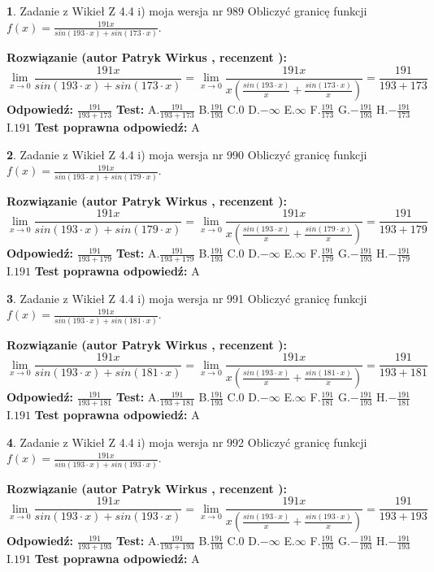 \documentclass[12pt, a4paper]{article}
\theoremstyle{definition} %
\newtheorem{zad}{}
\newcommand{\zadStart}[1]{\begin{zad}#1\newline}
\newcommand{\zadStop}{\end{zad}}
\newcommand{\rozwStart}[2]{\noindent \textbf{Rozwiązanie (autor #1 , recenzent #2): }\newline}
\newcommand{\rozwStop}{\newline}
\newcommand{\odpStart}{\noindent \textbf{Odpowiedź:}\newline}
\newcommand{\odpStop}{\newline}
\newcommand{\testStart}{\noindent \textbf{Test:}\newline}
\newcommand{\testStop}{\newline}
\newcommand{\kluczStart}{\noindent \textbf{Test poprawna odpowiedź:}\newline}
\newcommand{\kluczStop}{\newline}
\begin{document}
\zadStart{Zadanie z Wikieł Z 4.4 i) moja wersja nr 989}
Obliczyć granicę funkcji $f(x)=\frac{191x}{sin(193\cdot x) +sin(173\cdot x)}$.
\zadStop
\rozwStart{Patryk Wirkus}{}
$$\lim\limits_{x\to 0}\frac{191x}{sin(193\cdot x) +sin(173\cdot x)}=\lim\limits_{x\to 0}\frac{191x}{x(\frac{sin(193\cdot x)}{x}+\frac{sin(173\cdot x)}{x})}=\frac{191}{193+173}$$
\rozwStop
\odpStart
$\frac{191}{193+173}$
\odpStop
\testStart
A.$\frac{191}{193+173}$
B.$\frac{191}{193}$
C.$0$
D.$-\infty$
E.$\infty$
F.$\frac{191}{173}$
G.$-\frac{191}{193}$
H.$-\frac{191}{173}$
I.$191$
\testStop
\kluczStart
A
\kluczStop



\zadStart{Zadanie z Wikieł Z 4.4 i) moja wersja nr 990}
Obliczyć granicę funkcji $f(x)=\frac{191x}{sin(193\cdot x) +sin(179\cdot x)}$.
\zadStop
\rozwStart{Patryk Wirkus}{}
$$\lim\limits_{x\to 0}\frac{191x}{sin(193\cdot x) +sin(179\cdot x)}=\lim\limits_{x\to 0}\frac{191x}{x(\frac{sin(193\cdot x)}{x}+\frac{sin(179\cdot x)}{x})}=\frac{191}{193+179}$$
\rozwStop
\odpStart
$\frac{191}{193+179}$
\odpStop
\testStart
A.$\frac{191}{193+179}$
B.$\frac{191}{193}$
C.$0$
D.$-\infty$
E.$\infty$
F.$\frac{191}{179}$
G.$-\frac{191}{193}$
H.$-\frac{191}{179}$
I.$191$
\testStop
\kluczStart
A
\kluczStop



\zadStart{Zadanie z Wikieł Z 4.4 i) moja wersja nr 991}
Obliczyć granicę funkcji $f(x)=\frac{191x}{sin(193\cdot x) +sin(181\cdot x)}$.
\zadStop
\rozwStart{Patryk Wirkus}{}
$$\lim\limits_{x\to 0}\frac{191x}{sin(193\cdot x) +sin(181\cdot x)}=\lim\limits_{x\to 0}\frac{191x}{x(\frac{sin(193\cdot x)}{x}+\frac{sin(181\cdot x)}{x})}=\frac{191}{193+181}$$
\rozwStop
\odpStart
$\frac{191}{193+181}$
\odpStop
\testStart
A.$\frac{191}{193+181}$
B.$\frac{191}{193}$
C.$0$
D.$-\infty$
E.$\infty$
F.$\frac{191}{181}$
G.$-\frac{191}{193}$
H.$-\frac{191}{181}$
I.$191$
\testStop
\kluczStart
A
\kluczStop



\zadStart{Zadanie z Wikieł Z 4.4 i) moja wersja nr 992}
Obliczyć granicę funkcji $f(x)=\frac{191x}{sin(193\cdot x) +sin(193\cdot x)}$.
\zadStop
\rozwStart{Patryk Wirkus}{}
$$\lim\limits_{x\to 0}\frac{191x}{sin(193\cdot x) +sin(193\cdot x)}=\lim\limits_{x\to 0}\frac{191x}{x(\frac{sin(193\cdot x)}{x}+\frac{sin(193\cdot x)}{x})}=\frac{191}{193+193}$$
\rozwStop
\odpStart
$\frac{191}{193+193}$
\odpStop
\testStart
A.$\frac{191}{193+193}$
B.$\frac{191}{193}$
C.$0$
D.$-\infty$
E.$\infty$
F.$\frac{191}{193}$
G.$-\frac{191}{193}$
H.$-\frac{191}{193}$
I.$191$
\testStop
\kluczStart
A
\kluczStop
\end{document}

